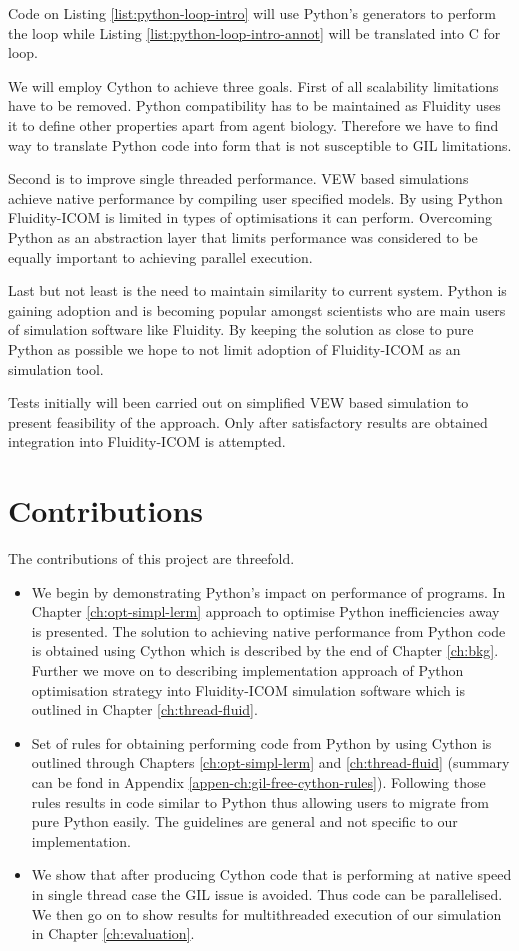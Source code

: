 \documentclass[12pt, a4paper]{report}
\begin{document}
Code on Listing \ref{list:python-loop-intro} will use Python's generators
to perform the loop while Listing \ref{list:python-loop-intro-annot} will
be translated into C for loop.

We will employ Cython to achieve three goals.
First of all scalability limitations have to be removed. Python compatibility
has to be maintained as Fluidity uses it to define other properties apart from
agent biology. Therefore we have to find way to translate Python code into
form that is not susceptible to GIL limitations.

Second is to improve single threaded performance. VEW based simulations achieve
native performance by compiling user specified models. By using Python
Fluidity-ICOM is limited in types of optimisations it can perform. Overcoming
Python as an abstraction layer that limits performance was considered to be
equally important to achieving parallel execution.

Last but not least is the need to maintain similarity to current system.
Python is gaining adoption and is becoming popular amongst scientists who are
main users of simulation software like Fluidity. By keeping the solution
as close to pure Python as possible we hope to not limit adoption of
Fluidity-ICOM as an simulation tool.

Tests initially will been carried out on simplified VEW based simulation
to present feasibility of the approach. Only after satisfactory results
are obtained integration into Fluidity-ICOM is attempted.

\section{Contributions}\label{sec:intro-contrib}
The contributions of this project are threefold.
\begin{itemize}
  \item We begin by demonstrating Python's impact on performance
    of programs. In Chapter \ref{ch:opt-simpl-lerm} approach to
    optimise Python inefficiencies away is presented. The solution to
    achieving native performance from Python code is obtained using
    Cython which is described by the end of Chapter \ref{ch:bkg}.
    Further we move on to describing implementation approach of
    Python optimisation strategy into Fluidity-ICOM
    simulation software which is outlined in Chapter \ref{ch:thread-fluid}.
  \item Set of rules for obtaining performing code from Python by
    using Cython is outlined through Chapters \ref{ch:opt-simpl-lerm} and
    \ref{ch:thread-fluid} (summary can be fond in Appendix
    \ref{appen-ch:gil-free-cython-rules}). Following those rules results in code
    similar to Python thus allowing users to migrate from pure Python easily.
    The guidelines are general and not specific to our implementation.
  \item We show that after producing Cython code that is performing at native
    speed in single thread case the GIL issue is avoided. Thus
    code can be parallelised. We then go on to show results for multithreaded
    execution of our simulation in Chapter \ref{ch:evaluation}.
\end{itemize}
\end{document}
